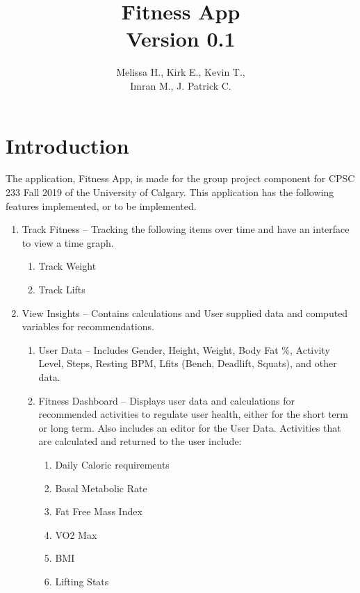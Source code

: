 \documentclass{book}
\title{Fitness App \\ \small{Version 0.1}}
\author{Melissa H., Kirk E., Kevin T., \\
Imran M., J. Patrick C.}
\begin{document}
\maketitle
\tableofcontents
\chapter{Introduction}
The application, Fitness App, is made for the group project component for CPSC 233 Fall 2019 of the University of Calgary. This application has the following features implemented, or to be implemented.
\begin{enumerate}
	\item Track Fitness -- Tracking the following items over time and have an interface to view a time graph.
	\begin{enumerate}
		\item Track Weight
		\item Track Lifts
	\end{enumerate}
	\item View Insights -- Contains calculations and User supplied data and computed variables for recommendations. 
	\begin{enumerate}
		\item User Data -- Includes Gender, Height, Weight, Body Fat \%, Activity Level, Steps, Resting BPM, Lfits (Bench, Deadlift, Squats), and other data.
		\item Fitness Dashboard -- Displays user data and calculations for recommended activities to regulate user health, either for the short term or long term. Also includes an editor for the User Data. Activities that are calculated and returned to the user include:
		\begin{enumerate}
			\item Daily Caloric requirements
			\item Basal Metabolic Rate
			\item Fat Free Mass Index
			\item VO2 Max
			\item BMI
			\item Lifting Stats
		\end{enumerate}
	\end{enumerate}
\end{enumerate}
\end{document}
